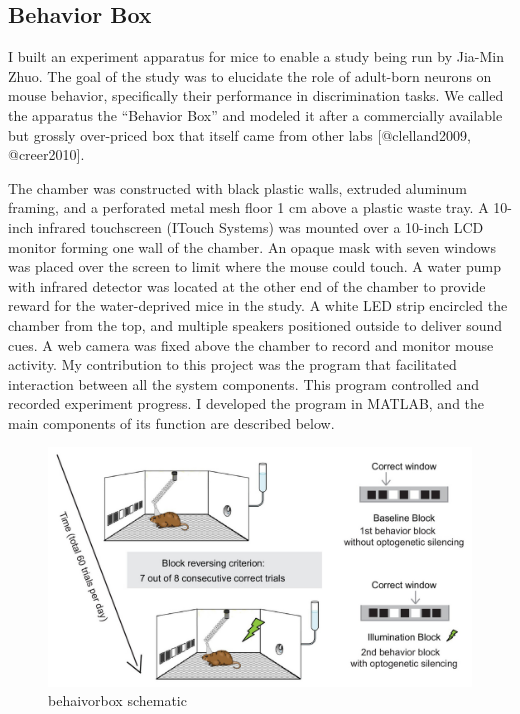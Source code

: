 \subsection{
	Behavior Box}\label{behavior-box} 

I built an experiment apparatus for mice to enable a study being run by Jia-Min Zhuo.
The goal of the study was to elucidate the role of adult-born neurons on mouse behavior, specifically their performance in discrimination tasks.
We called the apparatus the ``Behavior Box'' and modeled it after a commercially available but grossly over-priced box that itself came from other labs {[}@clelland2009, @creer2010{]}.

The chamber was constructed with black plastic walls, extruded aluminum framing, and a perforated metal mesh floor 1 cm above a plastic waste tray.
A 10-inch infrared touchscreen (ITouch Systems) was mounted over a 10-inch LCD monitor forming one wall of the chamber.
An opaque mask with seven windows was placed over the screen to limit where the mouse could touch.
A water pump with infrared detector was located at the other end of the chamber to provide reward for the water-deprived mice in the study.
A white LED strip encircled the chamber from the top, and multiple speakers positioned outside to deliver sound cues.
A web camera was fixed above the chamber to record and monitor mouse activity.
My contribution to this project was the program that facilitated interaction between all the system components.
This program controlled and recorded experiment progress.
I developed the program in MATLAB, and the main components of its function are described below.

\begin{figure}
	\includegraphics[width=15cm]{task-schematic.jpg}
	\caption{behaivorbox schematic}
	\label{fig:behaivorbox schematic}
\end{figure}

